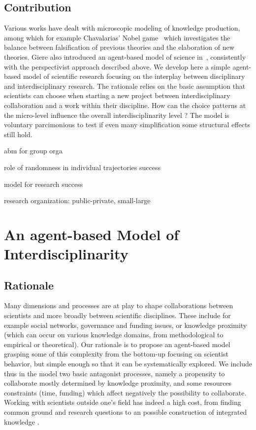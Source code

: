 \documentclass[utf8]{frontiersFPHY} %
\begin{document}
\subsection{Contribution}

Various works have dealt with microscopic modeling of knowledge production, among which for example Chavalarias' Nobel game~\cite{chavalarias2016s} which investigates the balance between falsification of previous theories and the elaboration of new theories. Giere also introduced an agent-based model of science in~\cite{giere2010agent}, consistently with the perspectivist approach described above. We develop here a simple agent-based model of scientific research focusing on the interplay between disciplinary and interdisciplinary research. The rationale relies on the basic assumption that scientists can choose when starting a new project between interdisciplinary collaboration and a work within their discipline. How can the choice patterns at the micro-level influence the overall interdisciplinarity level ? The model is voluntary parcimonious to test if even many simplification some structural effects still hold.


\cite{dionne2019diversity} abm for group orga

\cite{pluchino2019exploring} role of randomness in individual trajectories success

\cite{shneiderman2018twin} model for research success

\cite{rouse2018modeling} research organization: public-private, small-large




\section{An agent-based Model of Interdisciplinarity}

\subsection{Rationale}

Many dimensions and processes are at play to shape collaborations between scientists and more broadly between scientific disciplines. These include for example social networks, governance and funding issues, or knowledge proximity (which can occur on various knowledge domains, from methodological to empirical or theoretical). Our rationale is to propose an agent-based model grasping some of this complexity from the bottom-up focusing on scientist behavior, but simple enough so that it can be systematically explored. We include thus in the model two basic antagonist processes, namely a propensity to collaborate mostly determined by knowledge proximity, and some resources constraints (time, funding) which affect negatively the possibility to collaborate. Working with scientists outside one's field has indeed a high cost, from finding common ground and research questions to an possible construction of integrated knowledge \cite{frodeman2013sustainable}.
\end{document}
